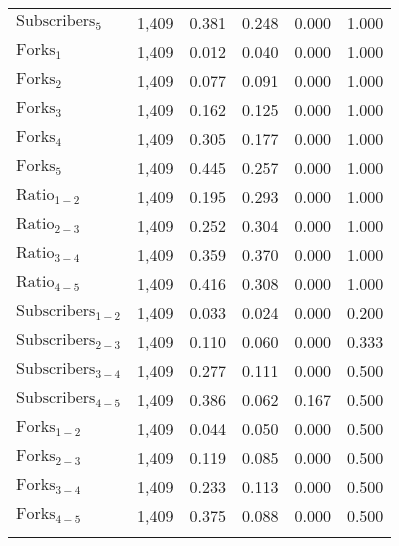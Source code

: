 \begin{tabular}{@{\extracolsep{5pt}}lccccc}
$\text{Subscribers}_{5}$ & 1,409 & 0.381 & 0.248 & 0.000 & 1.000 \\
$\text{Forks}_{1}$ & 1,409 & 0.012 & 0.040 & 0.000 & 1.000 \\
$\text{Forks}_{2}$ & 1,409 & 0.077 & 0.091 & 0.000 & 1.000 \\
$\text{Forks}_{3}$ & 1,409 & 0.162 & 0.125 & 0.000 & 1.000 \\
$\text{Forks}_{4}$ & 1,409 & 0.305 & 0.177 & 0.000 & 1.000 \\
$\text{Forks}_{5}$ & 1,409 & 0.445 & 0.257 & 0.000 & 1.000 \\
$\text{Ratio}_{1-2}$ & 1,409 & 0.195 & 0.293 & 0.000 & 1.000 \\
$\text{Ratio}_{2-3}$ & 1,409 & 0.252 & 0.304 & 0.000 & 1.000 \\
$\text{Ratio}_{3-4}$ & 1,409 & 0.359 & 0.370 & 0.000 & 1.000 \\
$\text{Ratio}_{4-5}$ & 1,409 & 0.416 & 0.308 & 0.000 & 1.000 \\
$\text{Subscribers}_{1-2}$ & 1,409 & 0.033 & 0.024 & 0.000 & 0.200 \\
$\text{Subscribers}_{2-3}$ & 1,409 & 0.110 & 0.060 & 0.000 & 0.333 \\
$\text{Subscribers}_{3-4}$ & 1,409 & 0.277 & 0.111 & 0.000 & 0.500 \\
$\text{Subscribers}_{4-5}$ & 1,409 & 0.386 & 0.062 & 0.167 & 0.500 \\
$\text{Forks}_{1-2}$ & 1,409 & 0.044 & 0.050 & 0.000 & 0.500 \\
$\text{Forks}_{2-3}$ & 1,409 & 0.119 & 0.085 & 0.000 & 0.500 \\
$\text{Forks}_{3-4}$ & 1,409 & 0.233 & 0.113 & 0.000 & 0.500 \\
$\text{Forks}_{4-5}$ & 1,409 & 0.375 & 0.088 & 0.000 & 0.500 \\
\hline \\[-1.8ex]
\end{tabular}
